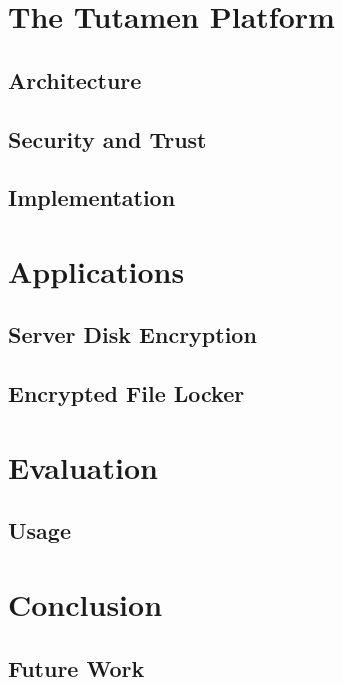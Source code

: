 \documentclass[letterpaper,twocolumn,10pt]{article}
\begin{document}


\section{The Tutamen Platform}
\label{sec:tutamen}

\subsection{Architecture}

\subsection{Security and Trust}

\subsection{Implementation}

\section{Applications}
\label{sec:apps}

\subsection{Server Disk Encryption}

\subsection{Encrypted File Locker}

\section{Evaluation}
\label{sec:eval}

\subsection{Usage}

\section{Conclusion}
\label{sec:conclusion}

\subsection{Future Work}

{
  \footnotesize
  
  
}
\end{document}

